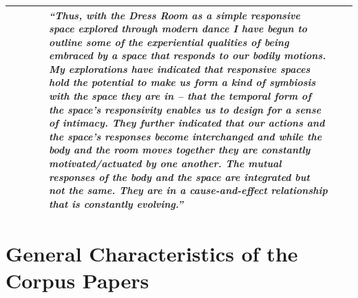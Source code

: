 \begin{landscape}
\begin{table}[p]
\begin{tabularx}{\linewidth}{@{}
    p{.16\linewidth}
    p{.12\linewidth}
    p{.10\linewidth}
    p{.13\linewidth}
    p{.20\linewidth}
    p{.12\linewidth}
    X
  @{}}
        & & & & \emph{``Thus, with the Dress Room as a simple responsive space explored through modern dance I have begun to outline some of the experiential qualities of being embraced by a space that responds to our bodily motions. My explorations have indicated that responsive spaces hold the potential to make us form a kind of symbiosis with the space they are in – that the temporal form of the space’s responsivity enables us to design for a sense of intimacy. They further indicated that our actions and the space’s responses become interchanged and while the body and the room moves together they are constantly motivated/actuated by one another. The mutual responses of the body and the space are integrated but not the same. They are in a cause-and-effect relationship that is constantly evolving.''} & & \\
         \bottomrule
  \end{tabularx}
\end{table}
\end{landscape}

\newpage 

\section{General Characteristics of the Corpus Papers}

